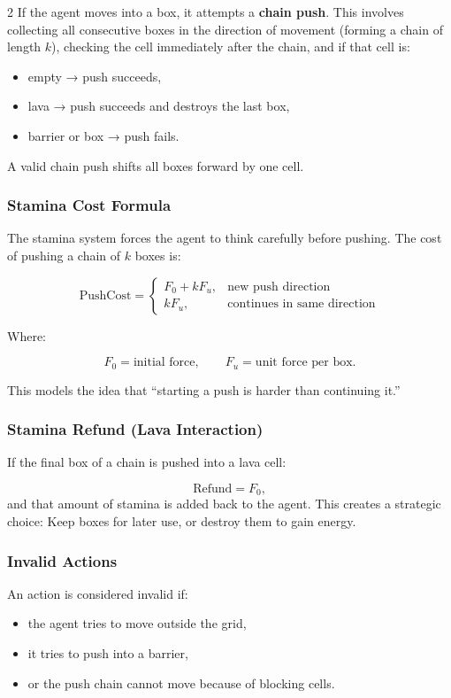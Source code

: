 \documentclass[a4paper]{article}
\begin{document}
\begin{multicols}{2}
If the agent moves into a box, it attempts a \textbf{chain push}. This involves collecting all consecutive boxes in the direction of movement (forming a chain of length \(k\)), checking the cell immediately after the chain, and if that cell is:
    \begin{itemize}
        \item empty → push succeeds,
        \item lava → push succeeds and destroys the last box,
        \item barrier or box → push fails.
    \end{itemize}

A valid chain push shifts all boxes forward by one cell.

\subsubsection{Stamina Cost Formula}

The stamina system forces the agent to think carefully before pushing. The cost of pushing a chain of \(k\) boxes is:

\[
\text{PushCost} =
\begin{cases}
F_0 + kF_u, & \text{new push direction}\\[4pt]
kF_u, & \text{continues in same direction}
\end{cases}
\]

Where:

\[
F_0 = \text{initial force}, \qquad 
F_u = \text{unit force per box.}
\]

This models the idea that “starting a push is harder than continuing it.”

\subsubsection{Stamina Refund (Lava Interaction)}

If the final box of a chain is pushed into a lava cell:

\[
\text{Refund} = F_0,
\]
and that amount of stamina is added back to the agent.  
This creates a strategic choice: Keep boxes for later use, or destroy them to gain energy.

\subsubsection{Invalid Actions}

An action is considered invalid if:
\begin{itemize}
    \item the agent tries to move outside the grid,
    \item it tries to push into a barrier,
    \item or the push chain cannot move because of blocking cells.
\end{itemize}


\end{multicols}
\end{document}
